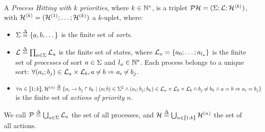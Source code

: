 \begin{definition} 
\label{def:ph}
  A \emph{Process Hitting with $k$ priorities}, where $k \in \mathbb{N}^*$, is a triplet $\mathcal{PH} = (\Sigma; \mathcal{L}; \mathcal{H}^{\langle k \rangle})$, with $\mathcal{H}^{\langle k \rangle} = (\mathcal{H}^{(1)}; \dots; \mathcal{H}^{(k)})$ a $k$-uplet, where:
  \begin{itemize}
    \item $\Sigma \stackrel{\Delta}= \{a,b,\dots\}$ is the finite set of \emph{sorts}.
    \item $\mathcal{L} \stackrel{\Delta}= \prod_{a \in \Sigma} \mathcal{L}_a$ is the finite set of states, where $\mathcal{L}_a = \{a_0 ; \ldots ; a_{l_a}\}$ is the finite set of \emph{processes} of sort $a \in \Sigma$ and $l_a \in \mathbb{N}^*$. Each process belongs to a unique sort: $\forall (a_i; b_j) \in \mathcal{L}_a \times \mathcal{L}_b, a \not\nobreak\mkern -2mu = b \Rightarrow a_i \not\nobreak\mkern -2mu = b_j$.
    \item $\forall n \in \llbracket 1; k \rrbracket, \mathcal{H}^{(n)} \stackrel{\Delta}= \{a_i\rightarrow b_j\Rsh b_k \mid (a; b) \in \Sigma^2 \wedge (a_i; b_j; b_k) \in \mathcal{L}_a \times \mathcal{L}_b \times \mathcal{L}_b \wedge b_j \not\nobreak\mkern -2mu = b_k \wedge a = b \Rightarrow a_i = b_j \}$ is the finite set of \emph{actions of priority $n$}.
  \end{itemize}
  We call $\mathcal{P} \stackrel{\Delta}= \bigcup_{a \in \Sigma} \mathcal{L}_a$ the set of all processes, and $\mathcal{H} \stackrel{\Delta}= \bigcup_{n \in \llbracket 1; k \rrbracket} \mathcal{H}^{(n)}$ the set of all actions.
\end{definition}

